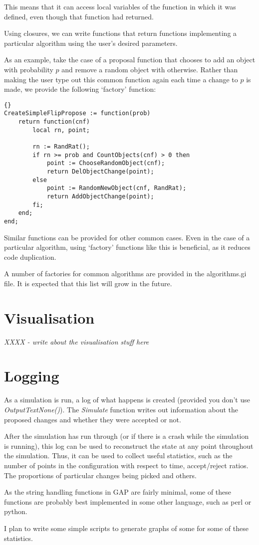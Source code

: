 \documentclass[12pt,a4paper]{book}  %
\begin{document}
This means that it can access local variables of the function in which
it was defined, even though that function had returned.

Using closures, we can write functions that return functions
implementing a particular algorithm using the user's desired
parameters.

As an example, take the case of a proposal function that chooses to
add an object with probability $p$ and remove a random object with
otherwise.  Rather than making the user type out this common function
again each time a change to $p$ is made, we provide the following
`factory' function:

\begin{lstlisting}{}
CreateSimpleFlipPropose := function(prob)
    return function(cnf)
        local rn, point;

        rn := RandRat();
        if rn >= prob and CountObjects(cnf) > 0 then
            point := ChooseRandomObject(cnf);
            return DelObjectChange(point);
        else
            point := RandomNewObject(cnf, RandRat);
            return AddObjectChange(point);
        fi;
    end;
end;
\end{lstlisting}

Similar functions can be provided for other common cases.  Even in the
case of a particular algorithm, using `factory' functions like
this is beneficial, as it reduces code duplication.

A number of factories for common algorithms are provided in the
algorithms.gi file.  It is expected that this list will grow in the
future.

\section{Visualisation}

\emph{XXXX - write about the visualisation stuff here}

\section{Logging}

As a simulation is run, a log of what happens is created (provided you
don't use \emph{OutputTextNone()}).  The \emph{Simulate} function
writes out information about the proposed changes and whether they
were accepted or not.

After the simulation has run through (or if there is a crash while the
simulation is running), this log can be used to reconstruct the state
at any point throughout the simulation.  Thus, it can be used to
collect useful statistics, such as the number of points in the
configuration with respect to time, accept/reject ratios.  The
proportions of particular changes being picked and others.

As the string handling functions in GAP are fairly minimal, some of
these functions are probably best implemented in some other language,
such as perl or python.

I plan to write some simple scripts to generate graphs of some for
some of these statistics.
\end{document}
